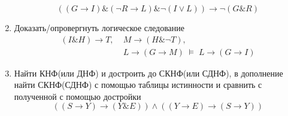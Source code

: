 \documentclass[10pt,a4paper]{article}
\begin{document}
\begin{multicols}{2}
\begin{enumerate}
$$((G\to I)\&(\neg R\to L)\&\neg(I\vee L))\to\neg(G\& R)$$
\item Доказать/опровергнуть логическое следование
\begin{equation*}\begin{split}(I\& H)\to T,\;& M\to(H\&\neg T),\; \\& L\to (G\to M)\;\models\; L\to(G\to I)\end{split}\end{equation*}
\item Найти КНФ(или ДНФ) и достроить до СКНФ(или СДНФ), в дополнение найти СКНФ(СДНФ) с помощью таблицы истинности и сравнить с полученной с помощью достройки
$$((S\to Y)\to(Y\& E))\wedge((Y\to E)\to(S\to Y))$$
\end{enumerate}

\end{multicols}

\pagebreak
\end{document}

